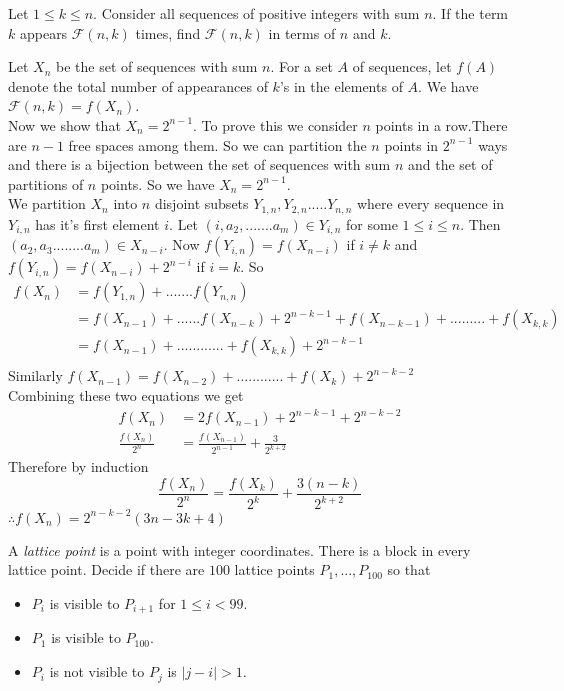 \documentclass{subfile}
\begin{document}
	\begin{problem}
		Let $1\leq k\leq n$. Consider all sequences of positive integers with sum $n$. If the term $k$ appears $\mathcal{F}(n,k)$ times, find $\mathcal{F}(n,k)$ in terms of $n$ and $k$.
	\end{problem}
	\begin{solution}
	    Let $X_n$ be the set of sequences with sum $n$. For a set $A$ of sequences, let $f(A)$ denote the total number of appearances of $k$'s in the elements of $A$. We have $\mathcal{F}(n,k)=f(X_n)$.\\
	    Now we show that $X_n=2^{n-1}$. To prove this we consider $n$ points in a row.There are $n-1$ free spaces among them. So we can partition the $n$ points 
	    in $2^{n-1}$ ways and there is a bijection between the set of sequences with sum $n$ and the set of partitions of $n$ points. So we have $X_n=2^{n-1}$.\\ 
	    We partition $X_n$ into $n$ disjoint subsets $Y_{1,n},Y_{2,n}.....Y_{n,n}$ where every sequence in $Y_{i,n}$ has it's first element $i$.
	    Let $(i,a_2,.......a_m)\in Y_{i,n}$ for some $1\leq i \leq n$.
	    Then $(a_2,a_3........a_m)\in X_{n-i}$.
	    Now $f(Y_{i,n})=f(X_{n-i})$ if $i\neq k$ and $f(Y_{i,n})=f(X_{n-i})+2^{n-i}$ if $i=k$.
     	So 
	\begin{equation*}
	\begin{aligned}
	f(X_n) & =f(Y_{1,n})+.......f(Y_{n,n})\\
	& =f(X_{n-1})+......f(X_{n-k})+2^{n-k-1}+f(X_{n-k-1})+.........+f(X_{k,k})\\
	& =f(X_{n-1})+............+f(X_{k,k})+2^{n-k-1}\\
	\end{aligned}
	\end{equation*}
	Similarly $f(X_{n-1})=f(X_{n-2})+............+f(X_{k})+2^{n-k-2}$\\
	Combining these two equations we get 
		\begin{align*}
			f(X_n) & = 2f(X_{n-1})+2^{n-k-1}+2^{n-k-2}\\
			\frac{f(X_n)}{2^n} & =\frac{f(X_{n-1})}{2^{n-1}}+\frac{3}{2^{k+2}}
		\end{align*}
	Therefore by induction $$\frac{f(X_n)}{2^n}=\frac{f(X_k)}{2^k}+\frac{3(n-k)}{2^{k+2}}$$
	$\therefore f(X_n)=2^{n-k-2}(3n-3k+4)$
	\end{solution}
	
	\begin{problem}
		A \textit{lattice point }is a point with integer coordinates. There is a block in every lattice point. Decide if there are $100$ lattice points $P_1,...,P_{100}$ so that 
		\begin{itemize}
			\item $P_i$ is visible to $P_{i+1}$ for $1\leq i<99$.
			\item $P_1$ is visible to $P_{100}$.
			\item $P_i$ is not visible to $P_j$ is $|j-i|>1$.
		\end{itemize}
	\end{problem}
	
\end{document}
